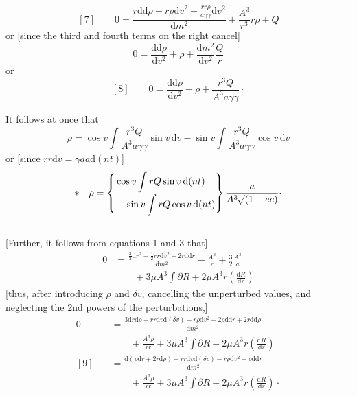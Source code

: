 \[
[7]\qquad 0=\frac{r\mathrm{d}\mathrm{d}\rho+r\rho\mathrm{d}v^{2}-\frac{rr\rho}{a\gamma\gamma}\mathrm{d}v^{2}}{\mathrm{d}m^{2}}+\frac{A^{3}}{r^{3}}r\rho+Q
\]
or [since the third and fourth terms on the right cancel]
\[
0=\frac{\mathrm{d}\mathrm{d}\rho}{\mathrm{d}v^{2}}+\rho+\frac{\mathrm{d}m^{2}}{\mathrm{d}v^{2}}\frac{Q}{r}
\]
or
\[
[8]\qquad 0=\frac{\mathrm{d}\mathrm{d}\rho}{\mathrm{d}v^{2}}+\rho+\frac{r^{3}Q}{A^{3}a\gamma\gamma}\mathpunct{\cdot}
\]
\par
\noindent\hspace*{\parindent}It follows at once that
\[
\rho=\cos v\int\frac{r^{3}Q}{A^{3}a\gamma\gamma}\sin v\,\mathrm{d}v-\sin v\int\frac{r^{3}Q}{A^{3}a\gamma\gamma}\cos v\,\mathrm{d}v
\]
or [since \(rr\mathrm{d}v=\gamma aa\mathrm{d}(nt)\)]
\[
*\quad\rho=\left\{\begin{aligned}&\cos v\int rQ\sin v\,\mathrm{d}(nt)\\[-2pt]&-\sin v\int rQ\cos v\,\mathrm{d}(nt)\end{aligned}\right\}\frac{a}{A^{3}\mathord{{}^{}\!\surd}(1-ee)}\mathpunct{\cdot}
\]
\par\medskip
\begin{center}\rule{.27\linewidth}{.4pt}\end{center}
\par
\noindent\hspace*{\parindent}[Further, it follows from equations 1 and 3 that]
\[
\begin{aligned}
0&=\frac{\frac32\mathrm{d}r^{2}-\frac12rr\mathrm{d}v^{2}+2r\mathrm{d}\mathrm{d}r}{\mathrm{d}m^{2}}-\frac{A^{3}}{r}+\frac32\frac{A^{3}}{a}\\
&\qquad+3\mu A^{3}\int\partial R+2\mu A^{3}r\left(\frac{\mathrm{d}R}{\mathrm{d}r}\right)
\end{aligned}
\]
[thus, after introducing \(\rho\) and \(\delta v\), cancelling the unperturbed values, and neglecting the 2nd powers of the perturbations,]
\[
\begin{aligned}
0&=\frac{3\mathrm{d}r\mathrm{d}\rho-rr\mathrm{d}v\mathrm{d}(\delta v)-r\rho\mathrm{d}v^{2}+2\rho\mathrm{d}\mathrm{d}r+2r\mathrm{d}\mathrm{d}\rho}{\mathrm{d}m^{2}}\\
&\qquad+\frac{A^{3}\rho}{rr}+3\mu A^{3}\int\partial R+2\mu A^{3}r\left(\frac{\mathrm{d}R}{\mathrm{d}r}\right)\\[6pt]
[9]\quad&=\frac{\mathrm{d}(\rho\mathrm{d}r+2r\mathrm{d}\rho)-rr\mathrm{d}v\mathrm{d}(\delta v)-r\rho\mathrm{d}v^{2}+\rho\mathrm{d}\mathrm{d}r}{\mathrm{d}m^{2}}\\
&\qquad+\frac{A^{3}\rho}{rr}+3\mu A^{3}\int\partial R+2\mu A^{3}r\left(\frac{\mathrm{d}R}{\mathrm{d}r}\right)\mathpunct{\cdot}
\end{aligned}
\]
